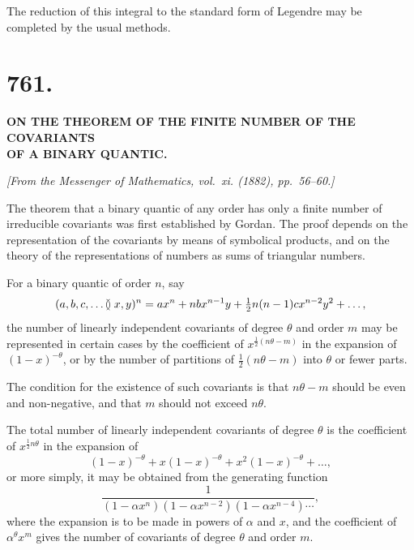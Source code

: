 \documentclass[12pt,a4paper]{article}
\begin{document}
The reduction of this integral to the standard form of Legendre may be
completed by the usual methods.

\newpage


\section*{761.}

\begin{center}
\textbf{ON THE THEOREM OF THE FINITE NUMBER OF THE COVARIANTS}\\[3pt]
\textbf{OF A BINARY QUANTIC.}
\end{center}

\begin{flushright}
\textit{[From the Messenger of Mathematics, vol.~xi. (1882), pp.~56--60.]}
\end{flushright}

The theorem that a binary quantic of any order has only a finite number of
irreducible covariants was first established by Gordan. The proof depends on
the representation of the covariants by means of symbolical products, and on
the theory of the representations of numbers as sums of triangular numbers.

For a binary quantic of order $n$, say
%
\[
(a, b, c, \ldots \mspace{-2mu}\between x, y)^n
= a x^n + n b x^{n-1} y + \tfrac{1}{2}n(n-1) c x^{n-2} y^2 + \ldots,
\]
%
the number of linearly independent covariants of degree $\theta$ and order $m$
may be represented in certain cases by the coefficient of $x^{\frac{1}{2}(n\theta-m)}$
in the expansion of $(1-x)^{-\theta}$, or by the number of partitions of
$\tfrac{1}{2}(n\theta-m)$ into $\theta$ or fewer parts.

The condition for the existence of such covariants is that $n\theta - m$ should
be even and non-negative, and that $m$ should not exceed $n\theta$.

The total number of linearly independent covariants of degree $\theta$ is
the coefficient of $x^{\frac{1}{2}n\theta}$ in the expansion of
%
\[
(1-x)^{-\theta} + x(1-x)^{-\theta} + x^2(1-x)^{-\theta} + \ldots,
\]
%
or more simply, it may be obtained from the generating function
%
\[
\frac{1}{(1-\alpha x^n)(1-\alpha x^{n-2})(1-\alpha x^{n-4})\cdots},
\]
%
where the expansion is to be made in powers of $\alpha$ and $x$, and the coefficient
of $\alpha^{\theta} x^m$ gives the number of covariants of degree $\theta$ and order $m$.
\end{document}
